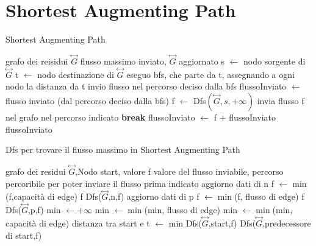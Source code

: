 \documentclass{article}
\begin{document}
\section{Shortest Augmenting Path}
\begin{algorithm}
\caption{Shortest Augmenting Path}
\begin{algorithmic}
\REQUIRE grafo dei reisidui $\overset{\leftrightarrow}{G}$
\ENSURE flusso massimo inviato, $\overset{\leftrightarrow}{G}$ aggiornato
\STATE s $\leftarrow$ nodo sorgente di $\overset{\leftrightarrow}{G}$
\STATE t $\leftarrow$ nodo destinazione di $\overset{\leftrightarrow}{G}$
\STATE eseguo bfs, che parte da t, assegnando a ogni nodo la distanza da t 
\STATE invio flusso nel percorso deciso dalla bfs
\STATE flussoInviato $\leftarrow$ flusso inviato (dal percorso deciso dalla bfs)
\STATE f $\leftarrow$ Dfs$(\overset{\leftrightarrow}{G}, s, +\infty)$
\STATE invia flusso f nel grafo nel percorso indicato
\ELSE
\STATE \textbf{break}
\ENDIF
\STATE flussoInviato $\leftarrow$ f + flussoInviato 
\ENDWHILE
\RETURN flussoInviato
\end{algorithmic}
\end{algorithm}
\begin{algorithm}
\caption{Dfs per trovare il flusso massimo in Shortest Augmenting Path}
\begin{algorithmic}
\REQUIRE grafo dei residui  $\overset{\leftrightarrow}{G}$,Nodo start, valore f
\ENSURE valore del flusso inviabile, percorso percoribile per poter inviare il flusso prima indicato
\STATE aggiorno dati di n
\STATE f $\leftarrow \min$(f,capacità di edge)
\RETURN f
\ENDIF
\RETURN Dfs($\overset{\leftrightarrow}{G}$,n,f)
\STATE aggiorno dati di p
\STATE f $\leftarrow \min$(f, flusso di edge)
\RETURN f
\ENDIF
\RETURN Dfs($\overset{\leftrightarrow}{G}$,p,f)
\ENDIF
\ENDFOR
\STATE min $\leftarrow +\infty$
\STATE min $\leftarrow \min$(min, flusso di edge)
\ENDIF
\ENDFOR
{}
\STATE min $\leftarrow \min$(min, capacità di edge)
\ENDIF
\ENDFOR
\STATE distanza tra start e t $\leftarrow$ min
\RETURN Dfs($\overset{\leftrightarrow}{G}$,start,f)
\ELSE
\RETURN Dfs($\overset{\leftrightarrow}{G}$,predecessore di start,f)
\ENDIF
\ENDIF
{}
\end{algorithmic}
\end{algorithm}
\end{document}
